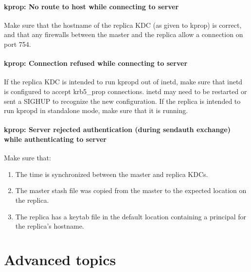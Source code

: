 \documentclass[letterpaper,10pt,english]{sphinxmanual}
\begin{document}
\subsubsection{kprop: No route to host while connecting to server}
\label{\detokenize{admin/troubleshoot:kprop-no-route}}\label{\detokenize{admin/troubleshoot:kprop-no-route-to-host-while-connecting-to-server}}
Make sure that the hostname of the replica KDC (as given to kprop) is
correct, and that any firewalls between the master and the replica
allow a connection on port 754.


\subsubsection{kprop: Connection refused while connecting to server}
\label{\detokenize{admin/troubleshoot:kprop-connection-refused-while-connecting-to-server}}\label{\detokenize{admin/troubleshoot:kprop-con-refused}}
If the replica KDC is intended to run kpropd out of inetd, make sure
that inetd is configured to accept krb5\_prop connections.  inetd may
need to be restarted or sent a SIGHUP to recognize the new
configuration.  If the replica is intended to run kpropd in standalone
mode, make sure that it is running.


\subsubsection{kprop: Server rejected authentication (during sendauth exchange) while authenticating to server}
\label{\detokenize{admin/troubleshoot:kprop-sendauth-exchange}}\label{\detokenize{admin/troubleshoot:kprop-server-rejected-authentication-during-sendauth-exchange-while-authenticating-to-server}}
Make sure that:
\begin{enumerate}
\item {} 
The time is synchronized between the master and replica KDCs.

\item {} 
The master stash file was copied from the master to the expected
location on the replica.

\item {} 
The replica has a keytab file in the default location containing a
 principal for the replica’s hostname.

\end{enumerate}


\chapter{Advanced topics}
\label{\detokenize{admin/advanced/index:advanced-topics}}\label{\detokenize{admin/advanced/index::doc}}
\end{document}
